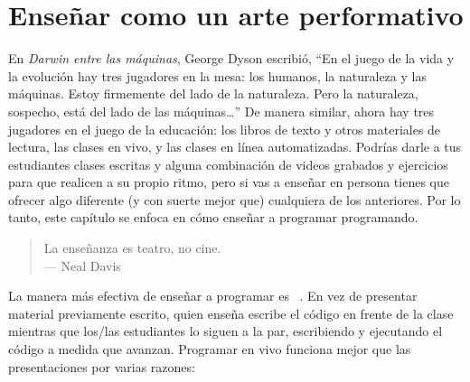 \chapter{Enseñar como un arte performativo}\label{s:performance}

En \emph{Darwin entre las máquinas},
George Dyson escribió,
``En el juego de la vida y la evolución hay tres jugadores en la mesa:
los humanos, la naturaleza y las máquinas.
Estoy firmemente del lado de la naturaleza.
Pero la naturaleza, sospecho, está del lado de las máquinas{\ldots}''
De manera similar, ahora hay tres jugadores en el juego de la educación:
los libros de texto y otros materiales de lectura,
las clases en vivo,
y las clases en línea automatizadas.
Podrías darle a tus estudiantes clases escritas y alguna combinación
de videos grabados y ejercicios para que realicen a su propio ritmo,
pero si vas a enseñar en persona tienes
que ofrecer algo diferente (y con suerte mejor que) cualquiera de los anteriores.
Por lo tanto, este capítulo se enfoca en cómo enseñar a programar programando.


\begin{quote}

  La enseñanza es teatro, no cine. \\
  --- Neal Davis

\end{quote}

La manera más efectiva de enseñar a programar es ~\cite{Rubi2013,Haar2017,Raj2018}.
En vez de presentar material previamente escrito,
quien enseña escribe el código en frente de la clase
mientras que los/las estudiantes lo siguen a la par,
escribiendo y ejecutando el código a medida que avanzan.
Programar en vivo funciona mejor que las presentaciones por varias razones:

